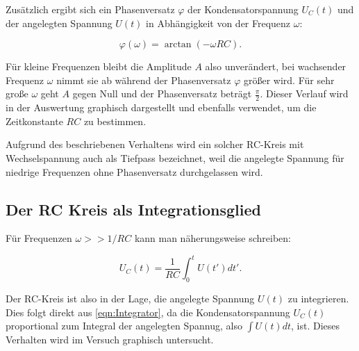 Zusätzlich ergibt sich ein Phasenversatz $\varphi$ der Kondensatorspannung $U_{C}(t)$ und der angelegten Spannung $U(t)$
in Abhängigkeit von der Frequenz $\omega$:

\begin{equation}
    \varphi (\omega )=\arctan (-\omega RC). \label{eqn:Phasenversatz}
\end{equation}

Für kleine Frequenzen bleibt die Amplitude $A$ also unverändert, bei wachsender Frequenz $\omega$ nimmt sie ab während
der Phasenversatz $\varphi$ größer wird. Für sehr große $\omega$ geht $A$ gegen Null und der Phasenversatz beträgt $\frac{\pi}{2}$.
Dieser Verlauf wird in der Auswertung graphisch dargestellt und ebenfalls verwendet, um die Zeitkonstante $RC$ zu bestimmen.

Aufgrund des beschriebenen Verhaltens wird ein solcher RC-Kreis mit Wechselspannung auch als Tiefpass bezeichnet, weil die angelegte
Spannung für niedrige Frequenzen ohne Phasenversatz durchgelassen wird.

\subsection{Der RC Kreis als Integrationsglied}
\label{sec:theorie-integration}
Für Frequenzen $\omega >> 1/RC$ kann man näherungsweise schreiben:

\begin{equation}
    U_{C}(t) = \frac{1}{RC}\int_{0}^{t}U({t}')d{t}'. \label{eqn:Integrator}
\end{equation}

Der RC-Kreis ist also in der Lage, die angelegte Spannung $U(t)$ zu integrieren. Dies folgt direkt aus \ref{eqn:Integrator},
da die Kondensatorspannung $U_{C}(t)$ proportional zum Integral der angelegten Spannug, also $\int U(t)dt$, ist.
Dieses Verhalten wird im Versuch graphisch untersucht.